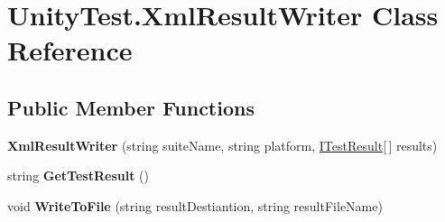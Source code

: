 \hypertarget{class_unity_test_1_1_xml_result_writer}{}\section{Unity\+Test.\+Xml\+Result\+Writer Class Reference}
\label{class_unity_test_1_1_xml_result_writer}
\subsection*{Public Member Functions}
\begin{DoxyCompactItemize}
\item 
\mbox{\label{class_unity_test_1_1_xml_result_writer_ad8b7d331715ddfa516face3e9b1635a5}} 
{\bfseries Xml\+Result\+Writer} (string suite\+Name, string platform, \hyperlink{interface_i_test_result}{I\+Test\+Result}\mbox{[}$\,$\mbox{]} results)
\item 
\mbox{\label{class_unity_test_1_1_xml_result_writer_af0ed18a86117293c046c40946a77bebf}} 
string {\bfseries Get\+Test\+Result} ()
\item 
\mbox{\label{class_unity_test_1_1_xml_result_writer_ad2bd046059415e5dcac6cbc150c488d2}} 
void {\bfseries Write\+To\+File} (string result\+Destiantion, string result\+File\+Name)
\end{DoxyCompactItemize}
